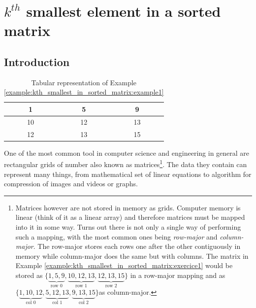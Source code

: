 %



\chapter{$k^{th}$ smallest element in a sorted matrix}
\label{ch:kth_smallest_in_sorted_matrix}
\section*{Introduction}
\begin{table}
	\centering
	\begin{framed}  
	\begin{tabular}{|c|c|c|}
	\hline
	1  & 5  & 9  \\ \hline
	10 & 12 & 13 \\ \hline
	12 & 13 & 15 \\ \hline
\end{tabular}%
\caption{Tabular representation of Example \ref{example:kth_smallest_in_sorted_matrix:example1}}
\label{tab:kth_smallest_in_sorted_matrix:example1}
\end{framed}
\end{table} 

One of the most common tool in computer science and engineering in general are rectangular grids of number also known as matrices\footnote{Matrices however are not stored in memory as grids. Computer memory is linear (think of it as a linear array) and therefore matrices must be mapped into it in some way. Turns out there is not only a single way of performing such a mapping, with the most common ones being \textit{row-major} and \textit{column-major}. The row-major stores each rows one after the other contiguously in memory  while column-major does the same but with columns. The matrix in Example \ref{example:kth_smallest_in_sorted_matrix:exercice1} would be stored as $\{\underbrace{1,5,9}_{\text{row 0}},\underbrace{10,12,13}_{\text{row 1}},\underbrace{12,13,15}_{\text{row 2}}\}$ in a row-major mapping and as $\{\underbrace{1,10,12}_{\text{col 0}},\underbrace{5,12,13}_{\text{col 1}},\underbrace{9,13,15}_{\text{col 2}}\}$as column-major.}. The data they  contain can represent many things, from mathematical set of linear equations to algorithm for compression of images and videos or graphs.

